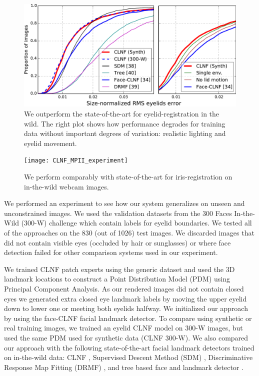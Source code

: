 \begin{figure}
    \centering
    \includegraphics[width=\columnwidth]{figs/CLNF_300W_experiment.pdf}
    \caption{We outperform the state-of-the-art for eyelid-registration in the wild. The right plot shows how performance degrades for training data without important degrees of variation: realistic lighting and eyelid movement.}
    \label{fig:clnf_results_wild}
\end{figure}

\begin{figure}
    \centering
    \texttt{[image: CLNF\_MPII\_experiment]}
    \caption{We perform comparably with state-of-the-art for iris-registration on in-the-wild webcam images.}
    \label{fig:clnf_results_MPII}
\end{figure}

% 

We performed an experiment to see how our system generalizes on unseen and unconstrained images. We used the validation datasets from the 300 Faces In-the-Wild (300-W) challenge \cite{sagonas2013300} which contain labels for eyelid boundaries. We tested all of the approaches on the 830 (out of 1026) test images. We discarded images that did not contain visible eyes (occluded by hair or sunglasses) or where face detection failed for other comparison systems used in our experiment.

We trained CLNF patch experts using the generic \dataset dataset and used the 3D landmark locations to construct a Point Distribution Model (PDM) using Principal Component Analysis. 
As our rendered images did not contain closed eyes we generated extra closed eye landmark labels by moving the upper eyelid down to lower one or meeting both eyelids halfway.
We initialized our approach by using the face-CLNF \cite{baltrusaitis2013constrained} facial landmark detector.
To compare using synthetic or real training images, we trained an eyelid CLNF model on 300-W images, but used the same PDM used for synthetic data (CLNF 300-W).
We also compared our approach with the following state-of-the-art facial landmark detectors trained on in-the-wild data: CLNF \cite{baltrusaitis2013constrained}, Supervised Descent Method (SDM) \cite{Xiong2013sdm}, Discriminative Response Map Fitting (DRMF) \cite{Asthana2013drmf}, and tree based face and landmark detector \cite{Zhu2012tree}. 

